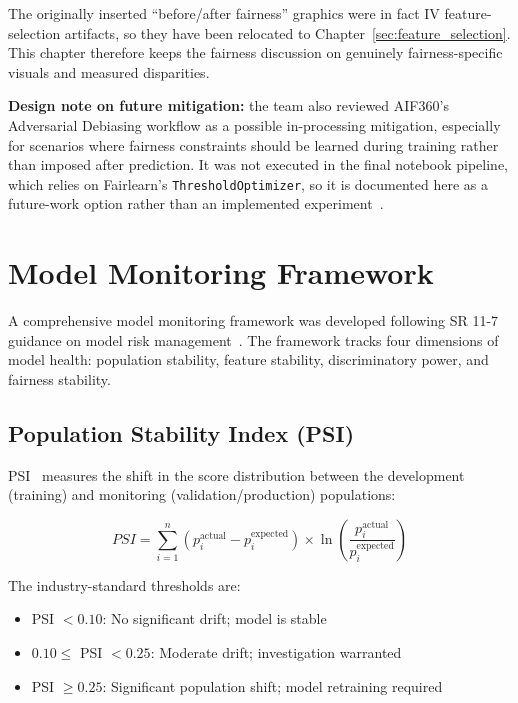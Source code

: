 The originally inserted ``before/after fairness'' graphics were in fact IV feature-selection artifacts, so they have been relocated to Chapter~\ref{sec:feature_selection}. This chapter therefore keeps the fairness discussion on genuinely fairness-specific visuals and measured disparities.

\textbf{Design note on future mitigation:} the team also reviewed \ac{AIF360}'s Adversarial Debiasing workflow as a possible in-processing mitigation, especially for scenarios where fairness constraints should be learned during training rather than imposed after prediction. It was not executed in the final notebook pipeline, which relies on Fairlearn's \texttt{ThresholdOptimizer}, so it is documented here as a future-work option rather than an implemented experiment~\cite{aif360,adversarial_debiasing}.

\section{Model Monitoring Framework}
\label{sec:monitoring}

A comprehensive model monitoring framework was developed following SR 11-7 guidance on model risk management~\cite{occ2011}. The framework tracks four dimensions of model health: population stability, feature stability, discriminatory power, and fairness stability.

\subsection{Population Stability Index (PSI)}

PSI~\cite{yurdakul2020} measures the shift in the score distribution between the development (training) and monitoring (validation/production) populations:

\begin{equation}
PSI = \sum_{i=1}^{n} (p_i^{\text{actual}} - p_i^{\text{expected}}) \times \ln\left(\frac{p_i^{\text{actual}}}{p_i^{\text{expected}}}\right)
\end{equation}

The industry-standard thresholds are:
\begin{itemize}
    \item PSI $< 0.10$: No significant drift; model is stable
    \item $0.10 \leq$ PSI $< 0.25$: Moderate drift; investigation warranted
    \item PSI $\geq 0.25$: Significant population shift; model retraining required
\end{itemize}

